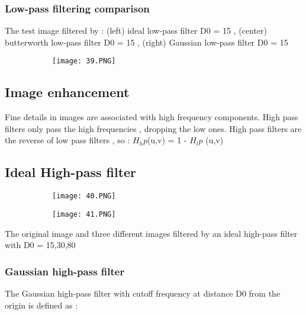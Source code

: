 \documentclass{article}
\begin{document}
\subsubsection{Low-pass filtering comparison}
The test image filtered by : (left) ideal low-pass filter D0 = 15 , (center) butterworth low-pass filter D0 = 15 , (right) Gaussian low-pass filter D0 = 15


 \begin{figure}[ht!]
  \centering
  \begin{subfigure}[b]{0.3\linewidth}
    \texttt{[image: 39.PNG]}
  \end{subfigure}
\end{figure}

\vspace{40mm}

\subsection{Image enhancement}

Fine details in images are associated with high frequency components.
High pass filters only pass the high frequencies , dropping the low ones.
High pass filters are the reverse of low pass filters , so : $H_hp$(u,v) = 1 - $H_lp$ (u,v)

\subsection{Ideal High-pass filter}

\begin{figure}[ht!]
  \centering
  \begin{subfigure}[b]{0.69\linewidth}
    \texttt{[image: 40.PNG]}
  \end{subfigure}
     \begin{subfigure}[b]{0.3\textwidth}
         \centering
         \texttt{[image: 41.PNG]}
     \end{subfigure}
\end{figure}

The original image and three different images filtered by an ideal high-pass filter with D0 = 15,30,80

\subsubsection{Gaussian high-pass filter}

The Gaussian high-pass filter with cutoff frequency at distance D0 from the origin is defined as  : 
\end{document}
